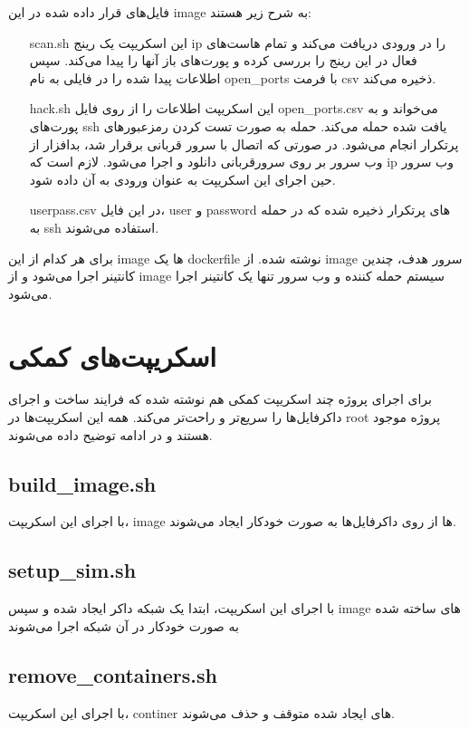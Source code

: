 \documentclass[11pt]{article}
\begin{document}
فایل‌های قرار داده شده در این image به شرح زیر هستند:
\begin{itemize}
    \item[scan.sh] این اسکریپت یک رینج ip را در ورودی دریافت می‌کند و تمام هاست‌های فعال در این رینج را بررسی کرده و پورت‌های باز آنها را پیدا می‌کند. سپس اطلاعات پیدا شده را در فایلی به نام open\_ports با فرمت csv ذخیره می‌کند.
    \item[hack.sh] این اسکریپت اطلاعات را از روی فایل open\_ports.csv می‌خواند و به پورت‌های ssh یافت شده حمله می‌کند. حمله به صورت تست کردن رمزعبورهای پرتکرار انجام می‌شود. در صورتی که اتصال با سرور قربانی برقرار شد، بدافزار از وب سرور بر روی سرورقربانی دانلود و اجرا می‌شود. لازم است که ip وب سرور حین اجرای این اسکریپت به عنوان ورودی به آن داده شود.
    \item[userpass.csv] در این فایل، user و password های پرتکرار ذخیره شده که در حمله به ssh استفاده می‌شوند.
\end{itemize}



برای هر کدام از این image ها یک dockerfile نوشته شده. از image سرور هدف، چندین کانتینر اجرا می‌شود و از image سیستم حمله کننده و وب سرور تنها یک کانتینر اجرا می‌شود.

\section{اسکریپت‌های کمکی}
برای اجرای پروژه چند اسکریپت کمکی هم نوشته شده که فرایند ساخت و اجرای داکرفایل‌ها را سریع‌تر و راحت‌تر می‌کند. همه این اسکریپت‌ها در root پروژه موجود هستند و در ادامه توضیح داده می‌شوند.

\subsection{build\_image.sh}
با اجرای این اسکریپت، image ها از روی داکرفایل‌ها به صورت خودکار ایجاد می‌شوند.

\subsection{setup\_sim.sh}
    با اجرای این اسکریپت، ابتدا یک شبکه داکر ایجاد شده و سپس image های ساخته شده به صورت خودکار در آن شبکه اجرا می‌شوند
    
\subsection{remove\_containers.sh}
با اجرای این اسکریپت، continer های ایجاد شده متوقف و حذف می‌شوند.
\end{document}
